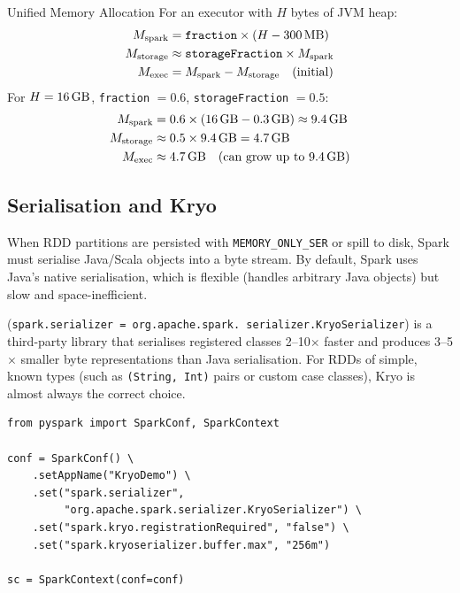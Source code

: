 \begin{defbox}{Unified Memory Allocation}
For an executor with $H$ bytes of JVM heap:
\begin{align}
M_{\text{spark}}   &= \texttt{fraction} \times (H - 300\,\text{MB}) \label{eq:spark-mem} \\
M_{\text{storage}} &\approx \texttt{storageFraction} \times M_{\text{spark}} \label{eq:storage-mem} \\
M_{\text{exec}}    &= M_{\text{spark}} - M_{\text{storage}} \quad \text{(initial)} \label{eq:exec-mem}
\end{align}
For $H = 16\,\text{GB}$, \texttt{fraction} $= 0.6$, \texttt{storageFraction}
$= 0.5$:
\begin{align*}
M_{\text{spark}}   &= 0.6 \times (16\,\text{GB} - 0.3\,\text{GB}) \approx 9.4\,\text{GB} \\
M_{\text{storage}} &\approx 0.5 \times 9.4\,\text{GB} = 4.7\,\text{GB} \\
M_{\text{exec}}    &\approx 4.7\,\text{GB} \quad \text{(can grow up to } 9.4\,\text{GB})
\end{align*}
\end{defbox}

\subsection{Serialisation and Kryo}
\label{subsec:kryo}

When RDD partitions are persisted with \texttt{MEMORY\_ONLY\_SER} or
spill to disk, Spark must serialise Java/Scala objects into a byte
stream. By default, Spark uses Java's native serialisation, which is
flexible (handles arbitrary Java objects) but slow and space-inefficient.

 (\texttt{spark.serializer = org.apache.spark.
serializer.KryoSerializer}) is a third-party library that serialises
registered classes 2--10$\times$ faster and produces 3--5$\times$ smaller
byte representations than Java serialisation. For RDDs of simple, known
types (such as \texttt{(String, Int)} pairs or custom case classes),
Kryo is almost always the correct choice.

\begin{lstlisting}[style=pyspark, caption={Enabling Kryo serialization and registering classes}]
from pyspark import SparkConf, SparkContext

conf = SparkConf() \
    .setAppName("KryoDemo") \
    .set("spark.serializer",
         "org.apache.spark.serializer.KryoSerializer") \
    .set("spark.kryo.registrationRequired", "false") \
    .set("spark.kryoserializer.buffer.max", "256m")

sc = SparkContext(conf=conf)
\end{lstlisting}

